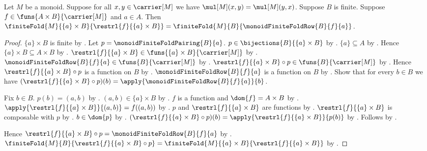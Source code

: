 \begin{theorem}\label{monoid_finite_fold_singleton_row}
    Let $M$ be a monoid.
    Suppose for all $x,y\in\carrier[M]$ we have
        $\mul[M](x,y)=\mul[M](y,x)$.
    Suppose $B$ is finite.
    Suppose $f\in\funs{A\times B}{\carrier[M]}$ and $a\in A$.
    Then
        $\finiteFold{M}{\{a\}\times B}{
            \restrl{f}{\{a\}\times B}}
        =\finiteFold{M}{B}{\monoidFiniteFoldRow{B}{f}{a}}$.
\end{theorem}
\begin{proof}
    $\{a\}\times B$ is finite by .
    Let $p=\monoidFiniteFoldPairing{B}{a}$.
    $p\in\bijections{B}{\{a\}\times B}$ by
        .
    $\{a\}\subseteq A$ by .
    Hence $\{a\}\times B\subseteq A\times B$ by
        .
    $\restrl{f}{\{a\}\times B}
        \in\funs{\{a\}\times B}{\carrier[M]}$ by
        .
    $\monoidFiniteFoldRow{B}{f}{a}
        \in\funs{B}{\carrier[M]}$ by
        .
    $\restrl{f}{\{a\}\times B}\circ p
        \in\funs{B}{\carrier[M]}$ by
        .
    Hence $\restrl{f}{\{a\}\times B}\circ p$ is a function on $B$ by
        .
    $\monoidFiniteFoldRow{B}{f}{a}$ is a function on $B$ by
        .
    Show that for every $b\in B$ we have
        $(\restrl{f}{\{a\}\times B}\circ p)(b)
            =\apply{\monoidFiniteFoldRow{B}{f}{a}}{b}$.
    \begin{subproof}
        Fix $b\in B$.
        $p(b)=(a,b)$ by
            .
        $(a,b)\in\{a\}\times B$ by
            .
        $f$ is a function and $\dom{f}=A\times B$ by
            .
        $\apply{\restrl{f}{\{a\}\times B}}{(a,b)}=f((a,b))$ by
            .
        $p$ and $\restrl{f}{\{a\}\times B}$ are functions by
            .
        $\restrl{f}{\{a\}\times B}$ is composable with $p$ by
            .
        $b\in\dom{p}$ by
            .
        $(\restrl{f}{\{a\}\times B}\circ p)(b)
            =\apply{\restrl{f}{\{a\}\times B}}{p(b)}$ by
            .
        Follows by .
    \end{subproof}
    Hence
        $\restrl{f}{\{a\}\times B}\circ p
            =\monoidFiniteFoldRow{B}{f}{a}$ by
        .
    $\finiteFold{M}{B}{\restrl{f}{\{a\}\times B}\circ p}
        =\finiteFold{M}{\{a\}\times B}{
            \restrl{f}{\{a\}\times B}}$ by
        .
\end{proof}

